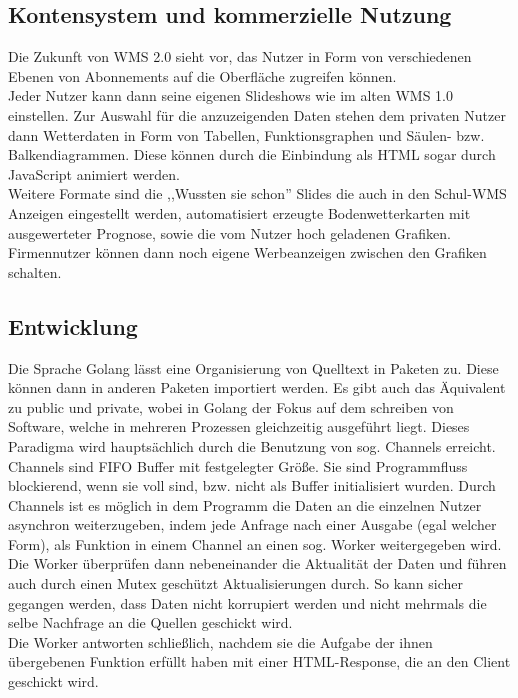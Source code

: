 \subsection{Kontensystem und kommerzielle Nutzung}
Die Zukunft von WMS 2.0 sieht vor, das Nutzer in Form von verschiedenen Ebenen von
Abonnements auf die Oberfläche zugreifen können.\\
Jeder Nutzer kann dann seine eigenen Slideshows wie im alten WMS 1.0 einstellen.
Zur Auswahl für die anzuzeigenden Daten stehen dem privaten Nutzer dann Wetterdaten
in Form von Tabellen, Funktionsgraphen und Säulen- bzw. Balkendiagrammen. Diese
können durch die Einbindung als HTML sogar durch JavaScript animiert werden. \\
Weitere Formate sind die ,,Wussten sie schon'' Slides die auch in den Schul-WMS Anzeigen
eingestellt werden, automatisiert erzeugte Bodenwetterkarten mit ausgewerteter Prognose,
sowie die vom Nutzer hoch geladenen Grafiken.
Firmennutzer können dann noch eigene Werbeanzeigen zwischen den Grafiken schalten.

\subsection{Entwicklung} %
Die Sprache Golang lässt eine Organisierung von Quelltext in Paketen zu. Diese können dann in
anderen Paketen importiert werden. Es gibt auch das Äquivalent zu public und private, wobei in
Golang der Fokus auf dem schreiben von Software, welche in mehreren Prozessen gleichzeitig ausgeführt liegt.
Dieses Paradigma wird hauptsächlich durch die Benutzung von sog. Channels erreicht. Channels sind FIFO
Buffer mit festgelegter Größe. Sie sind Programmfluss blockierend, wenn sie voll sind, bzw. nicht als Buffer
initialisiert wurden. Durch Channels ist es möglich in dem Programm die Daten an die einzelnen Nutzer asynchron
weiterzugeben, indem jede Anfrage nach einer Ausgabe (egal welcher Form), als Funktion in einem Channel an
einen sog. Worker weitergegeben wird.\\
Die Worker überprüfen dann nebeneinander die Aktualität der Daten und führen auch durch einen Mutex geschützt
Aktualisierungen durch. So kann sicher gegangen werden, dass Daten nicht korrupiert werden und nicht mehrmals die
selbe Nachfrage an die Quellen geschickt wird.\\
Die Worker antworten schließlich, nachdem sie die Aufgabe der ihnen übergebenen Funktion erfüllt haben mit einer
HTML-Response, die an den Client geschickt wird.
